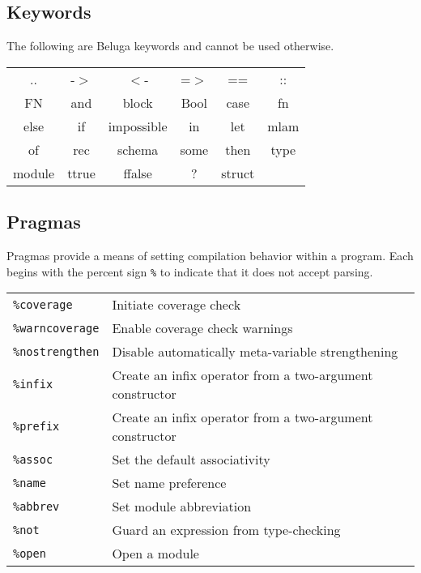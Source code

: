 \documentclass[11pt]{article}
\begin{document}

\subsection{Keywords}
The following are Beluga keywords and cannot be used otherwise. 
\begin{center}
\renewcommand{\arraystretch}{2}
\begin{tabular}{ c c c c c c }
.. & -$>$ & $<$-  & =$>$ &  ==  & :: \\
FN & and & block & Bool & case & fn \\
else & if & impossible & in & let & mlam \\
of & rec & schema & some & then & type \\
module & ttrue & ffalse & ? & struct &  \\
\end{tabular}
\end{center}

\subsection{Pragmas}
Pragmas provide a means of setting compilation behavior within a program. Each begins with the percent sign \texttt{\%} to indicate that it does not accept parsing. \\

\begin{tabular}{ | l l}
\texttt{\%coverage} & Initiate coverage check \\
\texttt{\%warncoverage} & Enable coverage check warnings \\
\texttt{\%nostrengthen} & Disable automatically meta-variable strengthening \\
\texttt{\%infix} & Create an infix operator from a two-argument constructor \\
\texttt{\%prefix} & Create an infix operator from a two-argument constructor \\
\texttt{\%assoc} & Set the default associativity \\
\texttt{\%name} & Set name preference \\
\texttt{\%abbrev} & Set module abbreviation \\
\texttt{\%not} & Guard an expression from type-checking\\
\texttt{\%open} & Open a module\\
\end{tabular}
\end{document}
